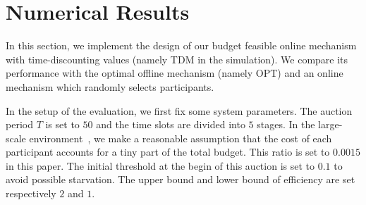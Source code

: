 \documentclass[conference,compsocconf,letterpaper,10pt]{IEEEtran}
\begin{document}
\section{Numerical Results}

In this section, we implement the design of our budget feasible online mechanism with time-discounting values (namely TDM in the simulation). We compare its performance with the optimal offline mechanism (namely OPT) and an online mechanism which randomly selects participants.

In the setup of the evaluation, we first fix some system parameters. The auction period $T$ is set to $50$ and the time slots are divided into $5$ stages. In the large-scale environment~\cite{6979011}, we make a reasonable assumption that the cost of each participant accounts for a tiny part of the total budget. This ratio  is set to $0.0015$ in this paper. The initial threshold at the begin of this auction is set to $0.1$ to avoid possible starvation. The upper bound and lower bound of efficiency are set respectively $2$ and $1$.
\end{document}
